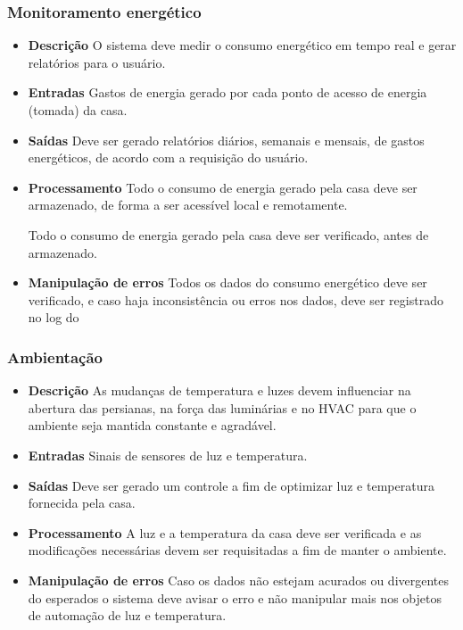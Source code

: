 \subsubsection{Monitoramento energético}
\begin{itemize}

	\item \textbf{Descrição}
	O sistema deve medir o consumo energético em tempo real e gerar relatórios para o usuário.

	\item \textbf{Entradas}
Gastos de energia gerado por cada ponto de acesso de energia (tomada) da casa.

	\item \textbf{Saídas}
	Deve ser gerado relatórios diários, semanais e mensais, de gastos energéticos, de acordo com a requisição do usuário.

	\item \textbf{Processamento}
	Todo o consumo de energia gerado pela casa deve ser armazenado, de forma a ser acessível local e remotamente.

	Todo o consumo de energia gerado pela casa deve ser verificado, antes de
armazenado.

	\item \textbf{Manipulação de erros}
	Todos os dados do consumo energético deve ser verificado, e caso haja inconsistência ou erros nos dados, deve ser registrado no log do

\end{itemize}

\subsubsection{Ambientação}
\begin{itemize}
	\item \textbf{Descrição}
	As mudanças de temperatura e luzes devem influenciar na abertura das persianas, na força das luminárias e no HVAC para que o ambiente seja mantida constante e agradável.

	\item \textbf{Entradas}
	Sinais de sensores de luz e temperatura.

	\item \textbf{Saídas}
	Deve ser gerado um controle a fim de optimizar luz e temperatura fornecida pela casa.

	\item \textbf{Processamento}
	A luz e a temperatura da casa deve ser verificada e as modificações necessárias devem ser requisitadas a fim de manter o ambiente.

	\item \textbf{Manipulação de erros}
	Caso os dados não estejam acurados ou divergentes do esperados o sistema deve avisar o erro e não manipular mais nos objetos de automação de luz e temperatura.

\end{itemize}

